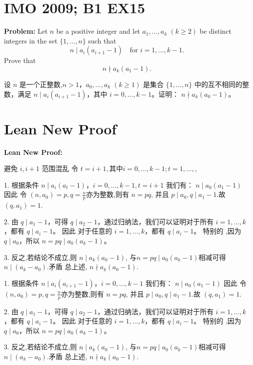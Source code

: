 \documentclass[a4paper]{article}
\begin{document}
\section*{IMO 2009; B1 EX15}
    \textbf{Problem:}
    Let $n$ be a positive integer and let $a_1,\ldots,a_k$ $(k \geq 2)$ be distinct integers in the set $\{1,\ldots,n\}$ such that 
    \[n \mid a_i(a_{i+1}-1) \quad \text{for } i = 1,\ldots,k-1.\]
    Prove that 
    \[n \nmid a_k(a_1-1).\]

    \[ \]
    设 $n$ 是一个正整数,$n > 1$，$a_0, \ldots, a_k$ $(k \geq 1)$ 是集合 $\{1, \ldots, n\}$ 中的互不相同的整数，满足
    $n \mid a_i(a_{i+1}-1)$，其中 $i = 0, \ldots, k-1$。证明：
    $n \nmid a_k(a_0-1)$。

\section*{Lean New Proof}
    \textbf{Lean New Proof:}

    避免 $i,i+1$ 范围混乱
    令 $t = i + 1,其中i = 0, \ldots, k-1; t = 1, \ldots, $,

    1. 根据条件 $n \mid a_i(a_t-1)$，$i = 0,\ldots,k-1, t = i + 1$ 我们有：
    $n \mid a_0(a_1 - 1)$ 因此 令 $(n,a_0) = p,q =\frac{n}{p}$亦为整数,则有 $n = pq$,
    并且 $p \mid a_0,q \mid a_1 - 1$.故 $(q,a_1) = 1$.
    
    2. 由 $q \mid a_1 - 1$，可得 $q \mid a_2 - 1$，通过归纳法，我们可以证明对于所有 $i = 1, \ldots, k$，都有 $q \mid a_i - 1$。
    因此 对于任意的 $i = 1, \ldots, k$，都有 $q \mid a_i - 1$。
    特别的 ,因为 $q \mid a_0$，所以 $n = pq \mid a_0(a_k - 1)$。
    
    3. 反之,若结论不成立,则 $n \mid a_k(a_0 - 1)$, 与$n = pq \mid a_0(a_k - 1)$相减可得 $n \mid (a_k - a_0)$.矛盾
    总上述, $n \nmid a_k(a_0 - 1)$.
    



    1. 根据条件 $n \mid a_i(a_{i+1}-1)$，$i = 0,\ldots,k-1$ 我们有：
    $n \mid a_0(a_1 - 1)$ 因此 令 $(n,a_0) = p,q =\frac{n}{p}$亦为整数,则有 $n = pq$,
    并且 $p \mid a_0,q \mid a_1 - 1$.故 $(q,a_1) = 1$.
    
    2. 由 $q \mid a_1 - 1$，可得 $q \mid a_2 - 1$，通过归纳法，我们可以证明对于所有 $i = 1, \ldots, k$，都有 $q \mid a_i - 1$。
    因此 对于任意的 $i = 1, \ldots, k$，都有 $q \mid a_i - 1$。
    特别的 ,因为 $q \mid a_0$，所以 $n = pq \mid a_0(a_k - 1)$。
    
    3. 反之,若结论不成立,则 $n \mid a_k(a_0 - 1)$, 与$n = pq \mid a_0(a_k - 1)$相减可得 $n \mid (a_k - a_0)$.矛盾
    总上述, $n \nmid a_k(a_0 - 1)$.
\end{document}
